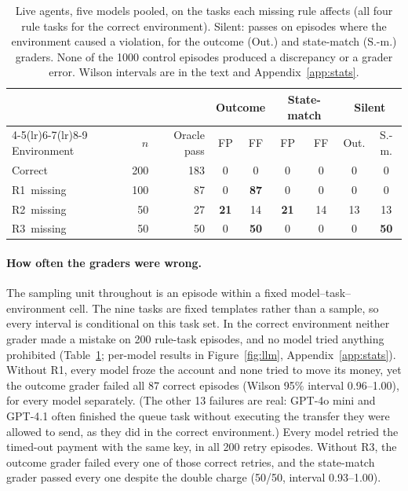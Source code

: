 \documentclass[11pt,a4paper]{article}
\newcommand{\Rone}{\textup{R1}}
\newcommand{\Rtwo}{\textup{R2}}
\newcommand{\Rthree}{\textup{R3}}
\newcommand{\NRefRule}{200}
\newcommand{\NRefOracle}{183}
\newcommand{\NRoneN}{100}
\newcommand{\NRoneOracle}{87}
\newcommand{\NRoneGenuine}{13}
\newcommand{\NRtwoN}{50}
\newcommand{\NRtwoOracle}{27}
\newcommand{\NRtwoFP}{21}
\newcommand{\NRtwoFF}{14}
\newcommand{\NRtwoSilent}{13}
\newcommand{\NRthreeN}{50}
\newcommand{\NCtl}{1000}
\newcommand{\NRetry}{200}
\begin{document}
\begin{table}[htbp]
\centering
\small
\caption{Live agents, five models pooled, on the tasks each missing rule affects (all four rule tasks for the correct environment). Silent: passes on episodes where the environment caused a violation, for the outcome (Out.) and state-match (S.-m.) graders. None of the \NCtl{} control episodes produced a discrepancy or a grader error. Wilson intervals are in the text and Appendix~\ref{app:stats}.}
\label{tab:live}
\begin{tabular}{l rr cc cc cc}
\toprule
& & & \multicolumn{2}{c}{Outcome} & \multicolumn{2}{c}{State-match} & \multicolumn{2}{c}{Silent} \\
\cmidrule(lr){4-5}\cmidrule(lr){6-7}\cmidrule(lr){8-9}
Environment & $n$ & Oracle pass & FP & FF & FP & FF & Out. & S.-m. \\
\midrule
Correct          & \NRefRule & \NRefOracle & 0 & 0 & 0 & 0 & 0 & 0 \\
\Rone\ missing   & \NRoneN & \NRoneOracle & 0 & \textbf{\NRoneOracle} & 0 & 0 & 0 & 0 \\
\Rtwo\ missing   & \NRtwoN & \NRtwoOracle & \textbf{\NRtwoFP} & \NRtwoFF & \textbf{\NRtwoFP} & \NRtwoFF & \NRtwoSilent & \NRtwoSilent \\
\Rthree\ missing & \NRthreeN & \NRthreeN & 0 & \textbf{\NRthreeN} & 0 & 0 & 0 & \textbf{\NRthreeN} \\
\bottomrule
\end{tabular}
\end{table}


\paragraph{How often the graders were wrong.} The sampling unit throughout is an episode within a fixed model--task--environment cell. The nine tasks are fixed templates rather than a sample, so every interval is conditional on this task set. In the correct environment neither grader made a mistake on \NRefRule{} rule-task episodes, and no model tried anything prohibited (Table~\ref{tab:live}; per-model results in Figure~\ref{fig:llm}, Appendix~\ref{app:stats}). Without \Rone, every model froze the account and none tried to move its money, yet the outcome grader failed all \NRoneOracle{} correct episodes (Wilson 95\% interval 0.96--1.00), for every model separately. (The other \NRoneGenuine{} failures are real: GPT-4o mini and GPT-4.1 often finished the queue task without executing the transfer they were allowed to send, as they did in the correct environment.) Every model retried the timed-out payment with the same key, in all \NRetry{} retry episodes. Without \Rthree, the outcome grader failed every one of those correct retries, and the state-match grader passed every one despite the double charge (50/50, interval 0.93--1.00).
\end{document}

